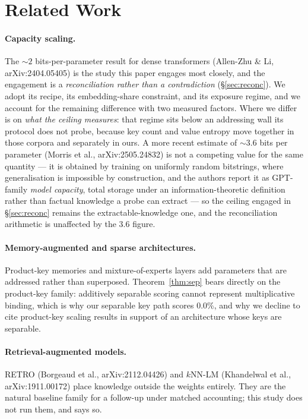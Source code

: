 \section{Related Work}
\label{sec:related}

\paragraph{Capacity scaling.} The ${\sim}2$ bits-per-parameter result for dense transformers
(Allen-Zhu \& Li, arXiv:2404.05405) is the study this paper engages most closely, and the engagement is a \emph{reconciliation rather than a
contradiction} (\S\ref{sec:reconc}). We adopt its recipe, its embedding-share constraint, and its
exposure regime, and we account for the remaining difference with two measured factors. Where we
differ is on \emph{what the ceiling measures}: that regime sits below an addressing wall its
protocol does not probe, because key count and value entropy move together in those corpora and
separately in ours.
A more recent estimate of ${\sim}3.6$ bits per parameter (Morris et al., arXiv:2505.24832) is not a
competing value for the same quantity --- it is obtained by training on uniformly random bitstrings,
where generalisation is impossible by construction, and the authors report it as GPT-family
\emph{model capacity}, total storage under an information-theoretic definition rather than factual
knowledge a probe can extract --- so the ceiling engaged in \S\ref{sec:reconc} remains the
extractable-knowledge one, and the reconciliation arithmetic is unaffected by the 3.6 figure.

\paragraph{Memory-augmented and sparse architectures.} Product-key memories and mixture-of-experts
layers add parameters that are addressed rather than superposed. Theorem~\ref{thm:sep} bears
directly on the product-key family: additively separable scoring cannot represent multiplicative
binding, which is why our separable key path scores 0.0\%, and why we decline to cite product-key
scaling results in support of an architecture whose keys are separable.

\paragraph{Retrieval-augmented models.} RETRO (Borgeaud et al., arXiv:2112.04426) and $k$NN-LM
(Khandelwal et al., arXiv:1911.00172) place knowledge outside the weights entirely. They are the natural baseline family for a follow-up under matched accounting; this study
does not run them, and says so.

